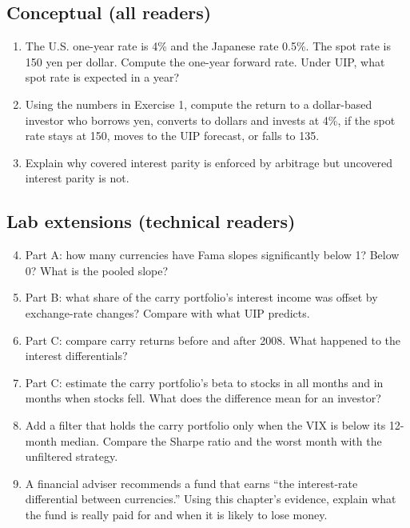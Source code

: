 \subsection*{Conceptual (all readers)}

\begin{enumerate}
  \item The U.S. one-year rate is 4\% and the Japanese rate 0.5\%. The spot rate is 150 yen per dollar. Compute the one-year forward rate. Under UIP, what spot rate is expected in a year?
  \item Using the numbers in Exercise 1, compute the return to a dollar-based investor who borrows yen, converts to dollars and invests at 4\%, if the spot rate stays at 150, moves to the UIP forecast, or falls to 135.
  \item Explain why covered interest parity is enforced by arbitrage but uncovered interest parity is not.
\end{enumerate}

\subsection*{Lab extensions (technical readers)}

\begin{enumerate}
  \setcounter{enumi}{3}
  \item Part A: how many currencies have Fama slopes significantly below 1? Below 0? What is the pooled slope?
  \item Part B: what share of the carry portfolio's interest income was offset by exchange-rate changes? Compare with what UIP predicts.
  \item Part C: compare carry returns before and after 2008. What happened to the interest differentials?
  \item Part C: estimate the carry portfolio's beta to stocks in all months and in months when stocks fell. What does the difference mean for an investor?
  \item Add a filter that holds the carry portfolio only when the VIX is below its 12-month median. Compare the Sharpe ratio and the worst month with the unfiltered strategy.
  \item A financial adviser recommends a fund that earns ``the interest-rate differential between currencies.'' Using this chapter's evidence, explain what the fund is really paid for and when it is likely to lose money.
\end{enumerate}


